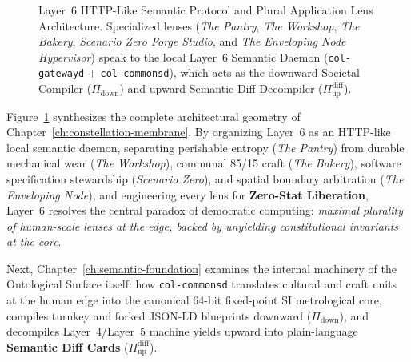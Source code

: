 \begin{figure}[htbp]
{%
}
\caption{Layer~6 HTTP-Like Semantic Protocol and Plural Application Lens Architecture. Specialized lenses (\textit{The Pantry}, \textit{The Workshop}, \textit{The Bakery}, \textit{Scenario Zero Forge Studio}, and \textit{The Enveloping Node Hypervisor}) speak to the local Layer~6 Semantic Daemon (\texttt{col-gatewayd} + \texttt{col-commonsd}), which acts as the downward Societal Compiler ($\Pi_{\mathrm{down}}$) and upward Semantic Diff Decompiler ($\Pi_{\mathrm{up}}^{\mathrm{diff}}$).}
\label{fig:ch1-constellation-membrane}
\end{figure}

Figure~\ref{fig:ch1-constellation-membrane} synthesizes the complete architectural geometry of
Chapter~\ref{ch:constellation-membrane}. By organizing Layer~6 as an HTTP-like local semantic
daemon, separating perishable entropy (\textit{The Pantry}) from durable mechanical wear
(\textit{The Workshop}), communal 85/15 craft (\textit{The Bakery}), software specification
stewardship (\textit{Scenario Zero}), and spatial boundary arbitration (\textit{The Enveloping
Node}), and engineering every lens for \textbf{Zero-Stat Liberation}, Layer~6 resolves the central
paradox of democratic computing: \textit{maximal plurality of human-scale lenses at the edge,
backed by unyielding constitutional invariants at the core}.

Next, Chapter~\ref{ch:semantic-foundation} examines the internal machinery of the Ontological
Surface itself: how \texttt{col-commonsd} translates cultural and craft units at the human edge
into the canonical 64-bit fixed-point SI metrological core, compiles turnkey and forked JSON-LD
blueprints downward ($\Pi_{\mathrm{down}}$), and decompiles Layer~4/Layer~5 machine yields upward
into plain-language \textbf{Semantic Diff Cards} ($\Pi_{\mathrm{up}}^{\mathrm{diff}}$).
